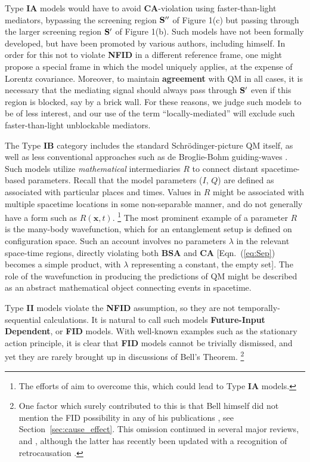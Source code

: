 \documentclass[onecolumn, nofootinbib, 12pt]{revtex4-1}
\begin{document}
Type {\bf IA} models would have to avoid {\bf CA}-violation using faster-than-light mediators, bypassing the screening region $\bf{S''}$ of Figure 1(c) but passing through the larger screening region $\bf{S'}$ of Figure 1(b).  Such models have not been formally developed, but have been promoted by various authors, including \textcite{bell1981} himself.  In order for this not to violate {\bf NFID} in a different reference frame, one might propose a special frame in which the model uniquely applies, at the expense of Lorentz covariance.  
Moreover, to maintain {\bf agreement} with QM in all cases, it is necessary that the mediating signal should always pass through $\bf{S'}$ even if this region is blocked, say by a brick wall.  For these reasons, we judge such models to be of less interest, and our use of the term ``locally-mediated'' will exclude such faster-than-light unblockable mediators.

The Type {\bf IB} category includes the standard Schr\"odinger-picture QM itself, as well as less conventional approaches such as de Broglie-Bohm guiding-waves \cite{bohm1952}.  Such models utilize \emph{mathematical} intermediaries $R$ to connect distant spacetime-based parameters.  Recall that the model parameters ($I$, $Q$) are defined as associated with particular places and times.  Values in $R$ might be associated with multiple spacetime locations in some non-separable manner, and do not generally have a form such as $R(\bm{x},t)$.%
\footnote{The efforts of \textcite{norsen2010,stoica2019} aim to  overcome this, which could lead to Type {\bf IA} models.}
The most prominent example of a parameter $R$ is the many-body wavefunction, which for an entanglement setup is defined on configuration space.  Such an account involves no parameters ${\lambda}$ in the relevant space-time regions, directly violating both {\bf BSA} and {\bf CA} [Eqn.~(\ref{eq:Sep}) becomes a simple product, with ${\lambda}$ representing a constant, the empty set].  The role of the wavefunction in producing the predictions of QM might be described as an abstract mathematical object connecting events in spacetime.

Type {\bf II} models violate the {\bf NFID} assumption, so they are not temporally-sequential calculations.  It is natural to call such models {\bf Future-Input Dependent}, or {\bf FID} models.  With well-known examples such as the stationary action principle, it is clear that {\bf FID} models cannot be trivially dismissed, and yet they are rarely brought up in discussions of Bell's Theorem.%
\footnote{One factor which surely contributed to this is that Bell himself did not mention the FID possibility in any of his publications \cite{bell2004}, see Section~\ref{sec:cause_effect}.  This omission continued in several major reviews, \textcite{goldstein2011} and \textcite{shimony2017}, although the latter has recently been updated with a recognition of retrocausation \cite{myrvold2019}.}
\end{document}
